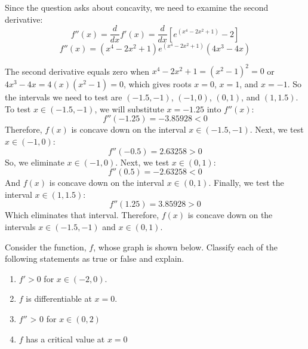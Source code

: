 \begin{Answer}[ref = concavity3]
Since the question asks about concavity, we need to examine the second derivative:
$$f''(x) = \frac{d}{dx} f'(x) = \frac{d}{dx} \left[ e^{(x^4 - 2x^2 + 1)} - 2 
\right]$$
$$f''(x) = \left( x^4 - 2x^2 + 1 \right) e^{(x^4 - 2x^2 + 1)} \left(4x^3 - 4x 
\right)$$

The second derivative equals zero when $x^4 - 2x^2 + 1 = (x^2 - 1)^2 = 0$ or 
$4x^3 - 4x = 4(x)(x^2-1) = 0$, which gives roots $x = 0$, $x = 1$, and $x = 
-1$. So the intervals we need to test are $(-1.5, -1)$, $(-1, 0)$, $(0, 1)$, 
and $(1, 1.5)$. To test $x \in (-1.5, -1)$, we will substitute $x = -1.25$ 
into $f''(x)$:
$$f''(-1.25) = -3.85928 < 0$$
Therefore, $f(x)$ is concave down on the interval $x \in (-1.5, -1)$. 
Next, we test $x \in (-1, 0)$:
$$f''(-0.5) = 2.63258 > 0$$
So, we eliminate $x \in (-1, 0)$. Next, we test $x \in (0, 1)$:
$$f''(0.5) = -2.63258 < 0$$
And $f(x)$ is concave down on the interval $x \in (0, 1)$. Finally, we test 
the interval $x \in (1, 1.5)$:
$$f''(1.25) = 3.85928 > 0$$
Which eliminates that interval. Therefore, $f(x)$ is concave down on the 
intervals $x \in (-1.5, -1)$ and $x \in (0, 1)$. 
\end{Answer}

\begin{Exercise} Consider the 
function, $f$, whose graph is shown below. Classify each of the following 
statements as true or false and explain. 
\begin{enumerate}
\item $f' > 0$ for $x \in (-2, 0)$.
\item $f$ is differentiable at $x = 0$.
\item $f''$ > 0 for $x \in (0, 2)$
\item $f$ has a critical value at $x = 0$
\end{enumerate}
\end{Exercise}

